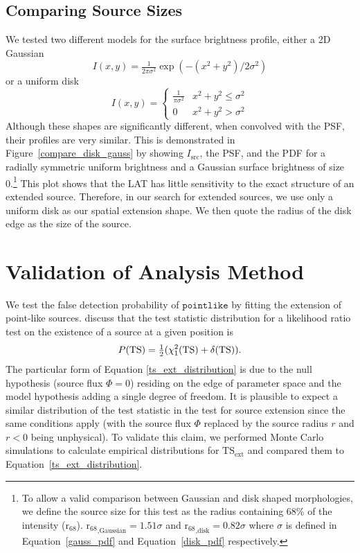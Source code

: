 \documentclass[12pt,preprint]{aastex}
\newcommand{\tsext}{{\ensuremath{\text{TS}_{\text{ext}}}}\xspace}
\newcommand{\rsixeight}{{\ensuremath{\text{r}_{68}}}\xspace}
\newcommand{\ts}{\text{TS}\xspace}
\newcommand{\pointlike}{\ensuremath{\mathtt{pointlike}}\xspace}
\begin{document}
\subsection{Comparing Source Sizes}

\label{compare_source_size}

We tested two different models for the
surface brightness profile, either a 2D Gaussian
\begin{equation}\label{gauss_pdf}
  I(x,y)=\tfrac{1}{2\pi\sigma^2}\exp\left(-(x^2+y^2)/2\sigma^2\right)
\end{equation}
or a uniform disk
\begin{equation}\label{disk_pdf}
  I(x,y)=
  \begin{cases}
    \frac{1}{\pi\sigma^2} & x^2+y^2\le\sigma^2 \\
    0                      & x^2+y^2>\sigma^2
  \end{cases}
\end{equation}
Although these shapes are significantly different, when convolved
with the PSF, their profiles are very similar.  
This is demonstrated in 
Figure~\ref{compare_disk_gauss}
by showing $I_\text{src}$, the PSF, and the PDF for
a radially symmetric uniform brightness and a Gaussian surface brightness of size 0.\footnote{To
allow a valid comparison between Gaussian and disk shaped morphologies,
we define the source size for this test as the radius containing
68\% of the intensity ($\rsixeight$).  $\rsixeight_\text{,Gaussian}=1.51\sigma$
and $\rsixeight_\text{,disk}=0.82\sigma$ where $\sigma$
is defined in Equation~\ref{gauss_pdf} and
Equation~\ref{disk_pdf} respectively.} This plot shows that the LAT 
has little sensitivity to
the exact structure of an extended source.
Therefore, in our
search for extended sources, we use only a uniform
disk as our spatial extension shape. We then quote the radius of the
disk edge as the size of the source.

\section{Validation of Analysis Method}

\label{monte_carlo_validation}

We test the false detection probability of \pointlike by fitting the extension of
point-like sources.
\cite{mattox_egret} discuss that the test statistic distribution
for a likelihood ratio test on the existence of a source at
a given position is 
\begin{equation}\label{ts_ext_distribution}
  P(\ts)=\onehalf(\chi^2_1(\ts)+\delta(\ts)).
\end{equation}
The particular form of Equation \ref{ts_ext_distribution} is
due to the null hypothesis (source flux $\Phi=0$) residing
on the edge of parameter space and the model hypothesis
adding a single degree of freedom. It is plausible to
expect a similar distribution of the test statistic
in the test for source extension since the same conditions
apply (with the source flux $\Phi$ replaced by the source radius $r$ and
$r<0$ being unphysical).
To validate this claim, we performed Monte Carlo
simulations
to calculate empirical distributions for $\tsext$ and
compared them to Equation~\ref{ts_ext_distribution}.
\end{document}
